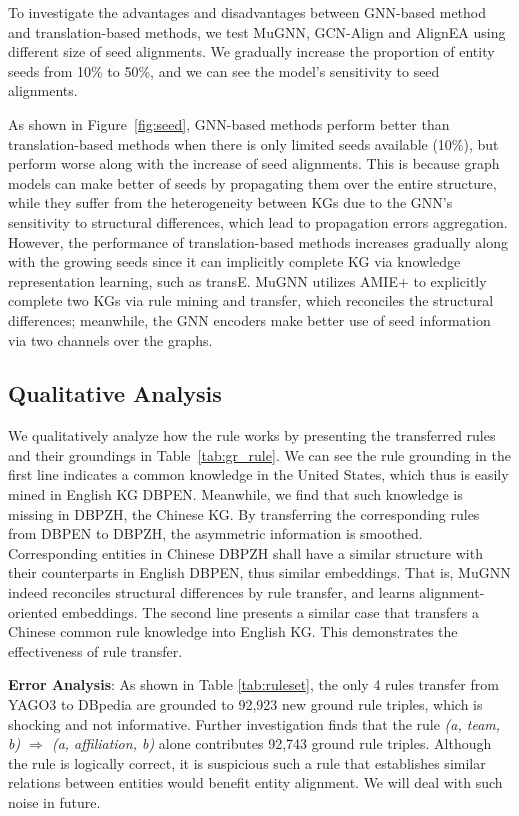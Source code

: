 \documentclass[11pt,a4paper]{article}
\begin{document}
To investigate the advantages and disadvantages between GNN-based method and translation-based methods, we test MuGNN, GCN-Align and AlignEA using different size of seed alignments. We gradually increase the proportion of entity seeds from 10\% to 50\%, and we can see the model's sensitivity to seed alignments.

As shown in Figure~\ref{fig:seed}, GNN-based methods perform better than translation-based methods when there is only limited seeds available (10\%), but perform worse along with the increase of seed alignments. This is because graph models can make better of seeds by propagating them over the entire structure, while they suffer from the heterogeneity between KGs due to the GNN's sensitivity to structural differences, which lead to propagation errors aggregation. However, the performance of translation-based methods increases gradually along with the growing seeds since it can implicitly complete KG via knowledge representation learning, such as transE. MuGNN utilizes AMIE+ to explicitly complete two KGs via rule mining and transfer, which reconciles the structural differences; meanwhile, the GNN encoders make better use of seed information via two channels over the graphs.

\subsection{Qualitative Analysis}

We qualitatively analyze how the rule works by presenting the transferred rules and their groundings in Table~\ref{tab:gr_rule}. We can see the rule grounding in the first line indicates a common knowledge in the United States, which thus is easily mined in English KG DBP{\tiny EN}. Meanwhile, we find that such knowledge is missing in DBP{\tiny ZH}, the Chinese KG. By transferring the corresponding rules from DBP{\tiny EN} to DBP{\tiny ZH}, the asymmetric information is smoothed. Corresponding entities in Chinese DBP{\tiny ZH} shall have a similar structure with their counterparts in English DBP{\tiny EN}, thus similar embeddings. That is, MuGNN indeed reconciles structural differences by rule transfer, and learns alignment-oriented embeddings. The second line presents a similar case that transfers a Chinese common rule knowledge into English KG. This demonstrates the effectiveness of rule transfer.


\noindent\textbf{Error Analysis}: As shown in Table \ref{tab:ruleset}, the only 4 rules transfer from YAGO3 to DBpedia are grounded to 92,923 new ground rule triples, which is shocking and not informative. Further investigation finds that the rule \emph{(a, team, b) $\Rightarrow$ (a, affiliation, b)} alone contributes 92,743 ground rule triples. Although the rule is logically correct, it is suspicious such a rule that establishes similar relations between entities would benefit entity alignment. We will deal with such noise in future.
\end{document}
